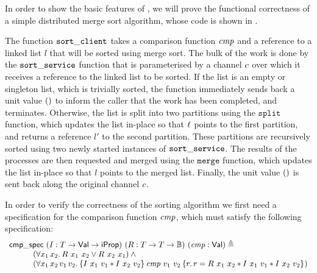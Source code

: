 In order to show the basic features of \pname, we will prove the functional
correctness of a simple distributed merge sort algorithm, whose code is shown
in .

\sortfigure

The function $\mathtt{sort\_client}$ takes a comparison function $\mathit{cmp}$ and a
reference to a linked list $\mathit{l}$ that will be sorted using merge sort.
The bulk of the work is done by the $\mathtt{sort\_service}$ function that is
parameterised by a channel $c$ over which it receives a reference to the
linked list to be sorted.
If the list is an empty or singleton list, which is trivially sorted, the
function immediately sends back a unit value $()$ to inform the caller that
the work has been completed, and terminates.
Otherwise, the list is split into two partitions using the $\mathtt{split}$
function, which updates the list in-place so that $\ell$ points to the first
partition, and returns a reference $l'$ to the second partition.
These partitions are recursively sorted using two newly started instances of
$\mathtt{sort\_service}$.
The results of the processes are then requested and merged using the $\mathtt{merge}$
function, which updates the list in-place so that $l$ points to the merged list.
Finally, the unit value $()$ is sent back along the original channel $c$.

In order to verify the correctness of the sorting algorithm we first need a
specification for the comparison function $\mathit{cmp}$, which must satisfy the
following specification:
\begin{equation*}
\begin{array}{l}
\cmpspecname\ (\interpvar : \tvar \to \Val \to \iProp)
  \ (\relvar : \tvar \to \tvar \to \bool)\ (\cmpvar : \Val) \eqdef \\
\quad\quad\quad(\All \var_1\,\var_2. \relvar\ \var_1\ \var_2 \lor \relvar\ \var_2\ \var_1) \land{} \\
\quad\quad\quad(\All \var_1\,\var_2\,\val_1\,\val_2.
  \hoare{\interpvar\ \var_1\ \val_1 * \interpvar\ \var_2\ \val_2}
    {\cmpvar\ \val_1\ \val_2}
    {\Ret r. r = \relvar\ \var_1\ \var_2 * I\ \var_1\ \val_1 * I\ \var_2\ \val_2})
\end{array}
\end{equation*}

